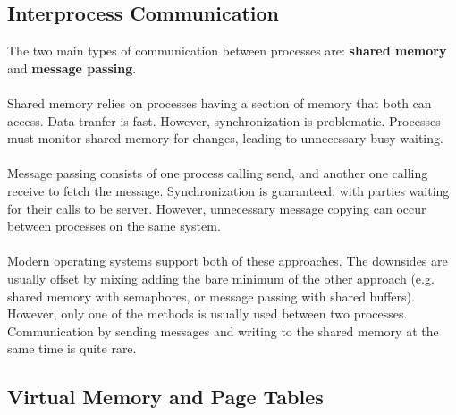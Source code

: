 \documentclass[conference]{IEEEtran}
\begin{document}
\subsection{Interprocess Communication}

The two main types of communication between processes are: \textbf{shared memory} and \textbf{message passing}.
\\
\\
Shared memory relies on processes having a section of memory that both can access. Data tranfer is fast. However, synchronization is problematic. Processes must monitor shared memory for changes, leading to unnecessary busy waiting.
\\
\\
Message passing consists of one process calling send, and another one calling receive to fetch the message. Synchronization is guaranteed, with parties waiting for their calls to be server. However, unnecessary message copying can occur between processes on the same system.
\\
\\
Modern operating systems support both of these approaches. The downsides are usually offset by mixing adding the bare minimum of the other approach (e.g. shared memory with semaphores, or message passing with shared buffers). However, only one of the methods is usually used between two processes. Communication by sending messages and writing to the shared memory at the same time is quite rare.

\subsection{Virtual Memory and Page Tables} \label{sec:vm}
\end{document}
